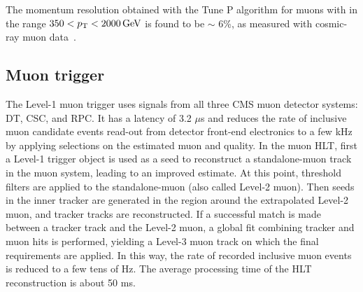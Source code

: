 The momentum resolution obtained with the Tune P algorithm for muons with \pt in the range $350 < p_{\mathrm{T}} < 2000\,\text{Ge\hspace{-.08em}V}$ is found to be $\sim$ 6\%, as measured with cosmic-ray muon data~\cite{Chatrchyan:2012xi,Radogna:2205870}.


\subsection{Muon trigger}\label{subsec:mutrigger}

The Level-1 muon trigger uses signals from all three CMS muon detector systems: DT, CSC, and RPC. It has a latency of 3.2 $\mu$s and reduces the rate of inclusive muon candidate events read-out from detector front-end electronics to a few kHz by applying selections on the estimated muon \pt and quality.
In the muon HLT, first a Level-1 trigger object is used as a seed to reconstruct a standalone-muon track in the muon system, leading to an improved \pt estimate. At this point, \pt threshold filters are applied to the standalone-muon (also called Level-2 muon). Then seeds in the inner tracker are generated in the region around the extrapolated Level-2 muon, and tracker tracks are reconstructed. If a successful match is made between a tracker track and the Level-2 muon, a global fit combining tracker and muon hits is performed, yielding a Level-3 muon track on which the final \pt requirements are applied. In this way, the rate of recorded inclusive muon events is reduced to a few tens of Hz. The average processing time of the HLT reconstruction is about 50 ms.


